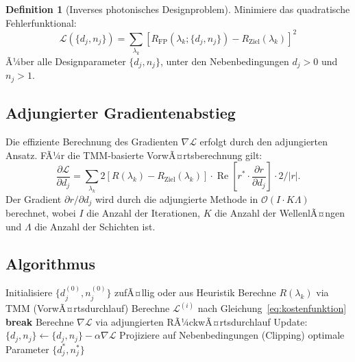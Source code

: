 ﻿\documentclass[a4paper,12pt]{scrreprt}
\theoremstyle{definition}
\newtheorem{definition}{Definition}[section]
\newcommand{\ordre}[1]{\mathcal{O}\!\left(#1\right)}
\newcommand{\Realteil}{\operatorname{Re}}
\begin{document}
\begin{definition}[Inverses photonisches Designproblem]
  Minimiere das quadratische Fehlerfunktional:
  \begin{equation}
    \mathcal{L}(\{d_j, n_j\}) = \sum_{\lambda_k}
    \left[R_\mathrm{FP}(\lambda_k; \{d_j, n_j\}) - R_\mathrm{Ziel}(\lambda_k)\right]^2
    \label{eq:kostenfunktion}
  \end{equation}
  Ã¼ber alle Designparameter $\{d_j, n_j\}$, unter den Nebenbedingungen
  $d_j > 0$ und $n_j > 1$.
\end{definition}

\subsection{Adjungierter Gradientenabstieg}

Die effiziente Berechnung des Gradienten $\nabla \mathcal{L}$ erfolgt durch
den adjungierten Ansatz. FÃ¼r die TMM-basierte VorwÃ¤rtsberechnung gilt:
\begin{equation}
  \frac{\partial \mathcal{L}}{\partial d_j} = \sum_{\lambda_k}
  2\left[R(\lambda_k) - R_\mathrm{Ziel}(\lambda_k)\right]
  \cdot \Realteil\left[r^* \cdot \frac{\partial r}{\partial d_j}\right] \cdot 2/|r|.
\end{equation}
Der Gradient $\partial r / \partial d_j$ wird durch die adjungierte Methode
in $\ordre{I \cdot K\Lambda}$ berechnet, wobei $I$ die Anzahl der
Iterationen, $K$ die Anzahl der WellenlÃ¤ngen und $\Lambda$ die Anzahl der
Schichten ist.

\subsection{Algorithmus}

\begin{algorithm}[H]
  \caption{Adjungierter Gradientenabstieg fÃ¼r inverses photonisches Design}
  \begin{algorithmic}[1]
    \State Initialisiere $\{d_j^{(0)}, n_j^{(0)}\}$ zufÃ¤llig oder aus Heuristik
      \State Berechne $R(\lambda_k)$ via TMM (VorwÃ¤rtsdurchlauf)
      \State Berechne $\mathcal{L}^{(i)}$ nach Gleichung~\eqref{eq:kostenfunktion}
       \textbf{break} \EndIf
      \State Berechne $\nabla \mathcal{L}$ via adjungierten RÃ¼ckwÃ¤rtsdurchlauf
      \State Update: $\{d_j, n_j\} \leftarrow \{d_j, n_j\} - \alpha \nabla \mathcal{L}$
      \State Projiziere auf Nebenbedingungen (Clipping)
    \EndFor
    \State \Return optimale Parameter $\{d_j^*, n_j^*\}$
  \end{algorithmic}
\end{algorithm}
\end{document}
